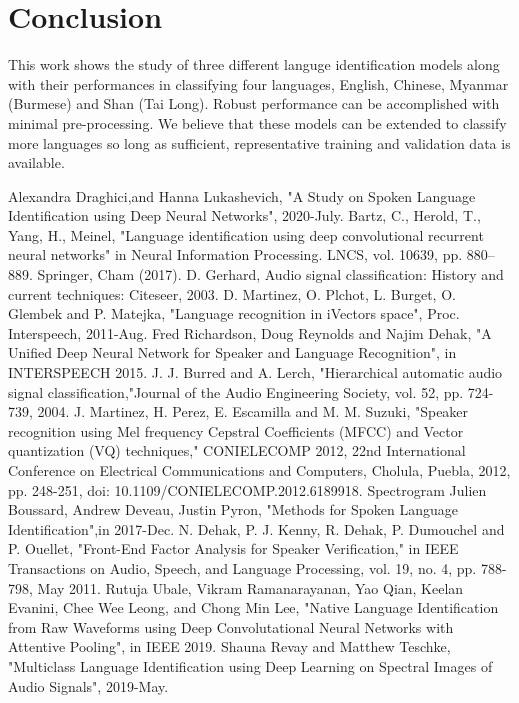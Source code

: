 \documentclass[conference]{IEEEtran}
\begin{document}
\section{Conclusion}\label{Sec:Conclusion}
This work shows the study of three different languge identification models along with their performances in classifying four languages, English, Chinese, Myanmar (Burmese) and Shan (Tai Long). Robust performance can be accomplished with minimal pre-processing. We believe that these models can be extended to classify more languages so long as sufficient, representative training and validation data is available.

\begin{thebibliography}{00}
Alexandra Draghici,and Hanna Lukashevich, "A Study on Spoken Language Identification using Deep Neural Networks", 2020-July.
Bartz, C., Herold, T., Yang, H., Meinel, "Language identification using deep convolutional recurrent neural networks" in Neural Information Processing. LNCS, vol. 10639, pp. 880–889. Springer, Cham (2017).
D. Gerhard, Audio signal classification: History and current techniques: Citeseer, 2003.
D. Martinez, O. Plchot, L. Burget, O. Glembek and P. Matejka, "Language recognition in iVectors space", Proc. Interspeech, 2011-Aug.
Fred Richardson, Doug Reynolds and Najim Dehak, "A Unified Deep Neural Network for Speaker and Language Recognition", in INTERSPEECH 2015.
J. J. Burred and A. Lerch, "Hierarchical automatic audio signal classification,"Journal of the Audio Engineering Society, vol. 52, pp. 724-739, 2004.
J. Martinez, H. Perez, E. Escamilla and M. M. Suzuki, "Speaker recognition using Mel frequency Cepstral Coefficients (MFCC) and Vector quantization (VQ) techniques," CONIELECOMP 2012, 22nd International Conference on Electrical Communications and Computers, Cholula, Puebla, 2012, pp. 248-251, doi: 10.1109/CONIELECOMP.2012.6189918.
Spectrogram
Julien Boussard, Andrew Deveau, Justin Pyron, "Methods for Spoken Language Identification",in 2017-Dec.
N. Dehak, P. J. Kenny, R. Dehak, P. Dumouchel and P. Ouellet, "Front-End Factor Analysis for Speaker Verification," in IEEE Transactions on Audio, Speech, and Language Processing, vol. 19, no. 4, pp. 788-798, May 2011.
Rutuja Ubale, Vikram Ramanarayanan, Yao Qian, Keelan Evanini, Chee Wee Leong, and Chong Min Lee, "Native Language Identification from Raw Waveforms using Deep Convolutational Neural Networks with Attentive Pooling", in IEEE 2019.
Shauna Revay and Matthew Teschke, "Multiclass Language Identification using Deep Learning on Spectral Images of Audio Signals", 2019-May. 

\end{thebibliography}
\end{document}

